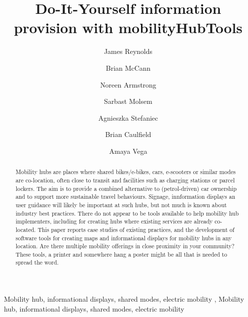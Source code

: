 \documentclass[preprint, 3p,
authoryear]{elsarticle} %
\begin{document}
\begin{frontmatter}

  \title{Do-It-Yourself information provision with mobilityHubTools}
    \author[]{James Reynolds%
  }
    \author[]{Brian McCann%
  }
    \author[]{Noreen Armstrong%
  }
    \author[]{Sarbast Molsem%
  }
    \author[]{Agnieszka Stefaniec%
  }
    \author[]{Brian Caulfield%
  }
    \author[]{Amaya Vega%
  }
  
  \begin{abstract}
  Mobility hubs are places where shared bikes/e-bikes, cars, e-scooters
  or similar modes are co-location, often close to transit and
  facilities such as charging stations or parcel lockers. The aim is to
  provide a combined alternative to (petrol-driven) car ownership and to
  support more sustainable travel behaviours. Signage, innformation
  displays an user guidance will likely be important at such hubs, but
  not much is known about industry best practices. There do not appear
  to be tools available to help mobility hub implementers, including for
  creating hubs where existing services are already co-located. This
  paper reports case studies of existing practices, and the development
  of software tools for creating maps and informational displays for
  mobility hubs in any location. Are there multiple mobility offerings
  in close proximity in your community? These tools, a printer and
  somewhere hang a poster might be all that is needed to spread the
  word.
  \end{abstract}
    \begin{keyword}
    Mobility hub, informational displays, shared modes, electric
mobility \sep 
    Mobility hub, informational displays, shared modes, electric
mobility
  \end{keyword}
  
 \end{frontmatter}
\end{document}
